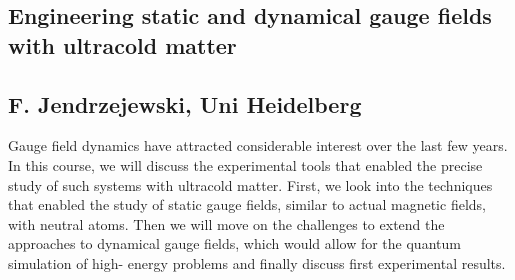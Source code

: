 \subsection*{Engineering static and dynamical gauge fields with ultracold matter}
\subsection*{F. Jendrzejewski, Uni Heidelberg}
\noindent
Gauge field dynamics have attracted considerable interest over the last few
years. In this course, we
will discuss the experimental tools that enabled the precise study of such
systems with ultracold
matter. First, we look into the techniques that enabled the study of static
gauge fields, similar to
actual magnetic fields, with neutral atoms. Then we will move on the
challenges to extend the
approaches to dynamical gauge fields, which would allow for the quantum
simulation of high-
energy problems and finally discuss first experimental results.
